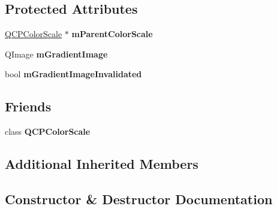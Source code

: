 \subsection*{Protected Attributes}
\begin{DoxyCompactItemize}
\item 
\mbox{\label{class_q_c_p_color_scale_axis_rect_private_a3e88b718f84ec0146ddc88e151a8d245}} 
\hyperlink{class_q_c_p_color_scale}{Q\+C\+P\+Color\+Scale} $\ast$ {\bfseries m\+Parent\+Color\+Scale}
\item 
\mbox{\label{class_q_c_p_color_scale_axis_rect_private_ad4f7c8ee1c6012d9950870811773119c}} 
Q\+Image {\bfseries m\+Gradient\+Image}
\item 
\mbox{\label{class_q_c_p_color_scale_axis_rect_private_a2c0b15b071e1f93006b48b5be022a631}} 
bool {\bfseries m\+Gradient\+Image\+Invalidated}
\end{DoxyCompactItemize}
\subsection*{Friends}
\begin{DoxyCompactItemize}
\item 
\mbox{\label{class_q_c_p_color_scale_axis_rect_private_a209311af95c80db34237574e5081a8f9}} 
class {\bfseries Q\+C\+P\+Color\+Scale}
\end{DoxyCompactItemize}
\subsection*{Additional Inherited Members}


\subsection{Constructor \& Destructor Documentation}
\mbox{\label{class_q_c_p_color_scale_axis_rect_private_ad3b242f75dd2b33581364a4e668a80db}} 

